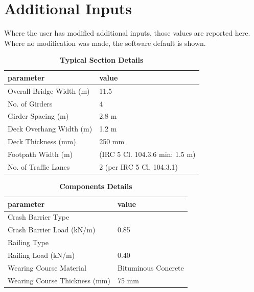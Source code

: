 \documentclass[12pt,a4paper]{report}
\numberwithin{table}{chapter}
\numberwithin{figure}{chapter}
\begin{document}
\newpage
\section{Additional Inputs}
\label{sec:additional-inputs}

Where the user has modified additional inputs, those values are reported here. Where no modification was made, the software default is shown.

\vspace{0.8cm}

\begin{longtable}{|L{5.5cm}|p{10.0cm}|}
\caption{\textbf{Typical Section Details}}
\hline
\textbf{parameter} & \textbf{value} \\
\hline
\textnormal{Overall Bridge Width (m)} & 11.5 \\[6pt]
\hline
\textnormal{No. of Girders} & 4 \\[6pt]
\hline
\textnormal{Girder Spacing (m)} & 2.8 m \\[6pt]
\hline
\textnormal{Deck Overhang Width (m)} & 1.2 m \\[6pt]
\hline
\textnormal{Deck Thickness (mm)} & 250 mm \\[6pt]
\hline
\textnormal{Footpath Width (m)} &  (IRC 5 Cl. 104.3.6 min: 1.5 m) \\[6pt]
\hline
\textnormal{No. of Traffic Lanes} & 2 (per IRC 5 Cl. 104.3.1) \\[6pt]
\hline
\end{longtable}

\vspace{0.8em}

\begin{longtable}{|L{5.5cm}|p{10.0cm}|}
\caption{\textbf{Components Details}}
\hline
\textbf{parameter} & \textbf{value} \\
\hline
\textnormal{Crash Barrier Type} &  \\[6pt]
\hline
\textnormal{Crash Barrier Load (kN/m)} & 0.85 \\[6pt]
\hline

\textnormal{Railing Type} &  \\[6pt]
\hline
\textnormal{Railing Load (kN/m)} & 0.40 \\[6pt]
\hline
\textnormal{Wearing Course Material} & Bituminous Concrete \\[6pt]
\hline
\textnormal{Wearing Course Thickness (mm)} & 75 mm \\[6pt]
\hline
\end{longtable}
\end{document}
